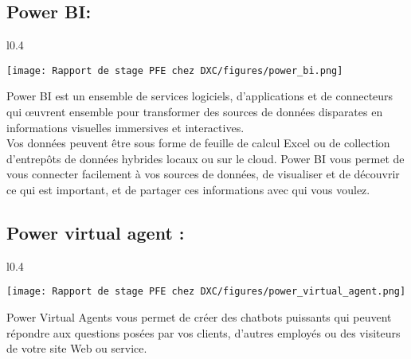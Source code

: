 \subsection{Power BI: }

\begin{wrapfigure}{l}{0.4\textwidth}
  \begin{center}
    \texttt{[image: Rapport de stage PFE chez DXC/figures/power\_bi.png]}
  \end{center}
\end{wrapfigure}

Power BI est un ensemble de services logiciels, d’applications et de connecteurs qui œuvrent ensemble pour transformer des sources de données disparates en informations visuelles immersives et interactives. 
\\
Vos données peuvent être sous forme de feuille de calcul Excel ou de collection d’entrepôts de données hybrides locaux ou sur le cloud. Power BI vous permet de vous connecter facilement à vos sources de données, de visualiser et de découvrir ce qui est important, et de partager ces informations avec qui vous voulez.

%
%

\subsection{Power virtual agent :}

\begin{wrapfigure}{l}{0.4\textwidth}
  \begin{center}
    \texttt{[image: Rapport de stage PFE chez DXC/figures/power\_virtual\_agent.png]}
  \end{center}
\end{wrapfigure}

Power Virtual Agents vous permet de créer des chatbots puissants qui peuvent répondre aux questions posées par vos clients, d’autres employés ou des visiteurs de votre site Web ou service.

